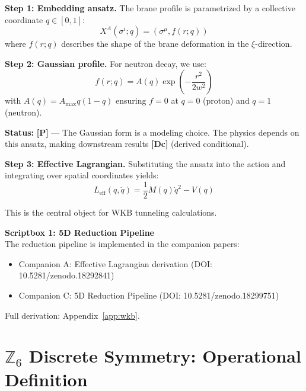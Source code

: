\documentclass[11pt,a4paper]{article}
\newcommand{\tagP}{\textcolor{red!70!black}{\textbf{[P]}}}
\newcommand{\tagDc}{\textcolor{blue!70!black}{\textbf{[Dc]}}}
\begin{document}
\textbf{Step 1: Embedding ansatz.} The brane profile is parametrized by a collective coordinate $q \in [0,1]$:
\begin{equation}
    X^A(\sigma^i; q) = (\sigma^\mu, f(r; q))
\end{equation}
where $f(r; q)$ describes the shape of the brane deformation in the $\xi$-direction.

\textbf{Step 2: Gaussian profile.} For neutron decay, we use:
\begin{equation}
    f(r; q) = A(q) \exp\left( -\frac{r^2}{2w^2} \right)
    \label{eq:gaussian_profile}
\end{equation}
with $A(q) = A_{\max} q(1-q)$ ensuring $f = 0$ at $q = 0$ (proton) and $q = 1$ (neutron).

\textbf{Status:} \tagP{} --- The Gaussian form is a modeling choice. The physics depends on this ansatz, making downstream results \tagDc{} (derived conditional).

\textbf{Step 3: Effective Lagrangian.} Substituting the ansatz into the action and integrating over spatial coordinates yields:
\begin{equation}
    L_{\text{eff}}(q, \dot{q}) = \frac{1}{2} M(q) \dot{q}^2 - V(q)
    \label{eq:L_eff}
\end{equation}

This is the central object for WKB tunneling calculations.

\begin{scriptbox}
\textbf{Scriptbox 1: 5D Reduction Pipeline}\\
The reduction pipeline is implemented in the companion papers:
\begin{itemize}[nosep]
    \item Companion A: Effective Lagrangian derivation (DOI: 10.5281/zenodo.18292841)
    \item Companion C: 5D Reduction Pipeline (DOI: 10.5281/zenodo.18299751)
\end{itemize}
Full derivation: Appendix~\ref{app:wkb}.
\end{scriptbox}
\label{sb:reduction}

\section{$\mathbb{Z}_6$ Discrete Symmetry: Operational Definition}
\label{sec:Z6_symmetry}
\end{document}
